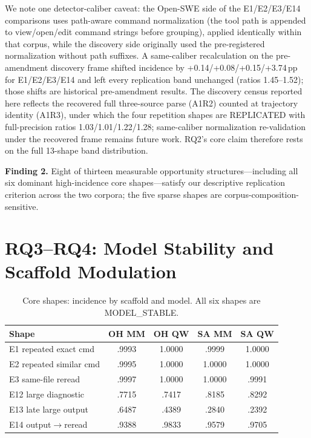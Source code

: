 ﻿\documentclass[sigconf,balance=false]{acmart}
\newenvironment{findingbox}{\par\vskip 3pt\noindent\begin{minipage}{\linewidth}}{\end{minipage}\par\vskip 3pt}
\begin{document}
We note one detector-caliber caveat: the Open-SWE side of the E1/E2/E3/E14 comparisons uses path-aware command normalization (the tool path is appended to view/open/edit command strings before grouping), applied identically within that corpus, while the discovery side originally used the pre-registered normalization without path suffixes. A same-caliber recalculation on the pre-amendment discovery frame shifted incidence by +0.14/+0.08/+0.15/+3.74\,pp for E1/E2/E3/E14 and left every replication band unchanged (ratios 1.45--1.52); those shifts are historical pre-amendment results. The discovery census reported here reflects the recovered full three-source parse (A1R2) counted at trajectory identity (A1R3), under which the four repetition shapes are REPLICATED with full-precision ratios 1.03/1.01/1.22/1.28; same-caliber normalization re-validation under the recovered frame remains future work. RQ2's core claim therefore rests on the full 13-shape band distribution.

\begin{findingbox}
\textbf{Finding 2.} Eight of thirteen measurable opportunity structures---including all six dominant high-incidence core shapes---satisfy our descriptive replication criterion across the two corpora; the five sparse shapes are corpus-composition-sensitive.
\end{findingbox}

\section{RQ3--RQ4: Model Stability and Scaffold Modulation}

\begin{table}[t]
\centering
\caption{Core shapes: incidence by scaffold and model. All six shapes are MODEL\_STABLE.}
\label{tab:factorial}
\small
\begin{tabular}{@{}lcccc@{}}
\toprule
\textbf{Shape} & \textbf{OH MM} & \textbf{OH QW} & \textbf{SA MM} & \textbf{SA QW} \\
\midrule
E1 repeated exact cmd & .9993 & 1.0000 & .9999 & 1.0000 \\
E2 repeated similar cmd & .9995 & 1.0000 & 1.0000 & 1.0000 \\
E3 same-file reread & .9997 & 1.0000 & 1.0000 & .9991 \\
E12 large diagnostic & .7715 & .7417 & .8185 & .8292 \\
E13 late large output & .6487 & .4389 & .2840 & .2392 \\
E14 output$\rightarrow$reread & .9388 & .9833 & .9579 & .9705 \\
\bottomrule
\end{tabular}
\end{table}
\end{document}

